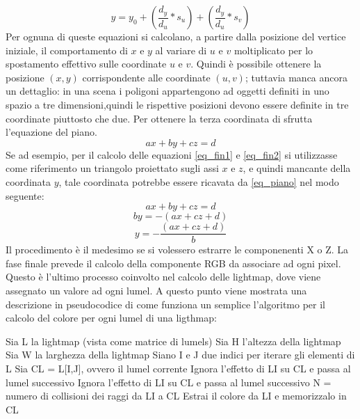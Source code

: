 \begin{equation}
y = y_0 + (\frac{d_y}{d_u} * s_u) + (\frac{d_y}{d_u} * s_v)
\label{eq_fin2}
\end{equation}
Per ognuna di queste equazioni si calcolano, a partire dalla posizione del vertice iniziale, il comportamento di $x$ e $y$ al variare di $u$ e $v$ moltiplicato per lo spostamento effettivo sulle coordinate $u$ e $v$.
Quindi è possibile ottenere la posizione $(x,y)$ corrispondente alle coordinate $(u,v)$; tuttavia  manca ancora un dettaglio: in una scena i poligoni appartengono ad oggetti definiti in uno spazio a tre dimensioni,quindi le rispettive posizioni devono essere definite in tre coordinate piuttosto che due. 
Per ottenere la terza coordinata di sfrutta l’equazione del piano. 
\begin{equation}
ax + by + cz = d
\label{eq_piano}
\end{equation}
Se ad esempio, per il calcolo delle equazioni \ref{eq_fin1} e \ref{eq_fin2} si utilizzasse come riferimento un triangolo proiettato sugli assi $x$ e $z$, e quindi mancante della coordinata $y$, tale coordinata potrebbe essere ricavata da \ref{eq_piano} nel modo seguente:
\begin{equation}
ax + by + cz = d
\end{equation}
\begin{equation}
by = -(ax + cz + d)
\end{equation}
\begin{equation}
y = - \frac{(ax + cz + d)}{b}
\end{equation}
Il procedimento è il medesimo se si volessero estrarre le componenenti X o Z.
La fase finale prevede il calcolo della componente RGB da associare ad ogni pixel.
Questo è l’ultimo processo coinvolto nel calcolo delle lightmap, dove viene assegnato un valore ad ogni lumel. A questo punto viene mostrata una descrizione in pseudocodice di come funziona un semplice l’algoritmo per il calcolo del colore per ogni lumel di una ligthmap:
\begin{algorithm}[H]
Sia L la lightmap (vista come matrice di lumels)\;
Sia H l'altezza della lightmap\;
Sia W la larghezza della lightmap\;
Siano I e J due indici per iterare gli elementi di L\;
  {
   { 
   Sia CL = L[I,J], ovvero il lumel corrente\;
    {
     {
     Ignora l'effetto di LI su CL e passa al lumel successivo\;
     }
	 {
     Ignora l'effetto di LI su CL e passa al lumel successivo\;
     }
	 {
     N = numero di collisioni dei raggi da LI a CL\;
     }
	 {
     Estrai il colore da LI e memorizzalo in CL\;
     }
    }
   }
  }
\end{algorithm}
